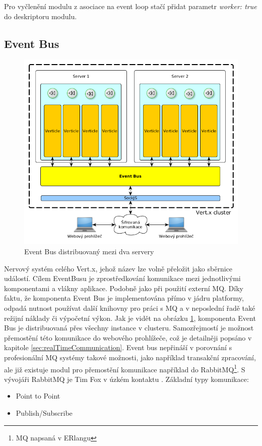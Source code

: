 Pro vyčlenění modulu z asociace na event loop stačí přidat parametr \emph{worker: true} do deskriptoru modulu.

\subsection{Event Bus}\label{sub:eventBus}

\begin{figure}[h]
\begin{centering}
\includegraphics[scale=0.5]{obrazky/2instance4_eventbus}
\par\end{centering}
\caption{Event Bus distribuovaný mezi dva servery}
\label{fig:2instance4_eventbus}
\end{figure}

Nervový systém celého Vert.x, jehož název lze volně přeložit jako sběrnice událostí. Cílem EventBusu je zprostředkování komunikace mezi jednotlivými komponentami a vlákny aplikace. Podobně jako při použití externí MQ. Díky faktu, že komponenta Event Bus je implementována přímo v jádru platformy, odpadá nutnost používat další knihovny pro práci s MQ a v neposlední řadě také režijní náklady či výpočetní výkon. Jak je vidět na obrázku \ref{fig:2instance4_eventbus}, komponenta Event Bus je distribuovaná přes všechny instance v clusteru. Samozřejmostí je možnost přemostění této komunikace do webového prohlížeče, což je detailněji popsáno v kapitole \ref{sec:realTimeCommunication}. Event bus nepřináší v porovnání s profesionální MQ systémy takové možnosti, jako například transakční zpracování, ale již existuje modul pro přemostění komunikace například do RabbitMQ\footnote{MQ napsaná v ERlangu}. S vývojáři RabbitMQ je Tim Fox v úzkém kontaktu \cite{vertxNodejs}. Základní typy komunikace:
\begin{itemize}
\item{Point to Point}
\item{Publish/Subscribe}
\end{itemize}

